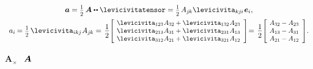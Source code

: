 {\nopagebreak\vspace{-0.5em}\begin{equation*}\begin{array}{c}
\bm{a} = \smalldisplaystyleonehalf \, \bm{A} \dotdotp \levicivitatensor =
\smalldisplaystyleonehalf \hspace{.25ex} A_{j\hspace{-0.1ex}k} \levicivita_{kj\hspace{-0.06ex}i} \hspace{.2ex} \bm{e}_i , \\[0.64em]
a_{i} \hspace{-0.16ex} = \smalldisplaystyleonehalf \hspace{.32ex} \levicivita_{ikj} \hspace{.1ex} A_{j\hspace{-0.1ex}k} = \hspace{.1em}
\displaystyle \onehalf \scalebox{0.9}[0.9]{$\left[\hspace{-0.25ex} \begin{array}{c}
\levicivita_{123} \hspace{.1ex} A_{32} + \levicivita_{132} \hspace{.1ex} A_{23} \\
\levicivita_{213} \hspace{.1ex} A_{31} + \levicivita_{231} \hspace{.1ex} A_{13} \\
\levicivita_{312} \hspace{.1ex} A_{21} + \levicivita_{321} \hspace{.1ex} A_{12}
\end{array} \right]$} \hspace{-0.2em} = \hspace{.1em}
\displaystyle \onehalf \scalebox{0.9}[0.9]{$\left[\hspace{-0.3ex} \begin{array}{c}
A_{32} - A_{23} \\
A_{13} - A_{31} \\
A_{21} - A_{12}
\end{array} \right]$} .
\vspace{.1em}\end{array}\end{equation*}

${\!\bm{A}_{\!\bm{\times}}}$
~${\hspace{-0.2ex}\bm{A}}$

}
